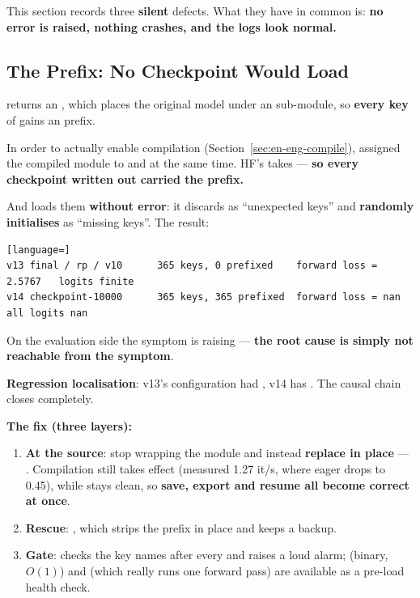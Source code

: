 \documentclass[11pt,openany]{article}
\begin{document}
This section records three \textbf{silent} defects. What they have in common is:
\textbf{no error is raised, nothing crashes, and the logs look normal.}

\subsection{The  Prefix: No Checkpoint Would Load}
\label{sec:en-def-prefix}

 returns an , which places the original model
under an  sub-module, so \textbf{every key} of  gains an
 prefix.

In order to actually enable compilation (Section~\ref{sec:en-eng-compile}),
 assigned the compiled module to  and
 at the same time. HF's  takes
 --- \textbf{so every checkpoint written out carried the
prefix.}

And  loads them \textbf{without error}: it discards
 as ``unexpected keys'' and \textbf{randomly initialises} 
as ``missing keys''. The result:

\begin{lstlisting}[language=]
v13 final / rp / v10      365 keys, 0 prefixed    forward loss = 2.5767   logits finite
v14 checkpoint-10000      365 keys, 365 prefixed  forward loss = nan      all logits nan
\end{lstlisting}

On the evaluation side the symptom is  raising
 --- \textbf{the root cause is simply not
reachable from the symptom}.

\textbf{Regression localisation}: v13's configuration had , v14 has
. The causal chain closes completely.

\textbf{The fix (three layers):}

\begin{enumerate}
\item \textbf{At the source}: stop wrapping the module and instead \textbf{replace
       in place} ---
      . Compilation still
      takes effect (measured 1.27 it/s, where eager drops to 0.45), while 
      stays clean, so \textbf{save, export and resume all become correct at once}.
\item \textbf{Rescue}: , which strips the prefix in
      place and keeps a  backup.
\item \textbf{Gate}:  checks the key names after every
       and raises a loud alarm;
       (binary, $O(1)$) and
       (which really runs one forward pass) are
      available as a pre-load health check.
\end{enumerate}
\end{document}
